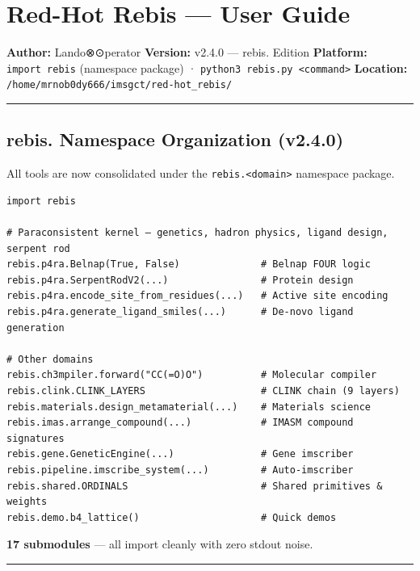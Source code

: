 \hypertarget{red-hot-rebis-user-guide}{%
\section{Red-Hot Rebis --- User Guide}\label{red-hot-rebis-user-guide}}

\textbf{Author:} Lando⊗⊙perator \textbf{Version:} v2.4.0 --- rebis.
Edition \textbf{Platform:} \texttt{import\ rebis} (namespace package) ·
\texttt{python3\ rebis.py\ \textless{}command\textgreater{}}
\textbf{Location:} \texttt{/home/mrnob0dy666/imsgct/red-hot\_rebis/}

\begin{center}\rule{0.5\linewidth}{0.5pt}\end{center}

\hypertarget{rebis.-namespace-organization-v2.4.0}{%
\subsection{rebis. Namespace Organization
(v2.4.0)}\label{rebis.-namespace-organization-v2.4.0}}

All tools are now consolidated under the
\texttt{rebis.\textless{}domain\textgreater{}} namespace package.

\begin{verbatim}
import rebis

# Paraconsistent kernel — genetics, hadron physics, ligand design, serpent rod
rebis.p4ra.Belnap(True, False)              # Belnap FOUR logic
rebis.p4ra.SerpentRodV2(...)                # Protein design
rebis.p4ra.encode_site_from_residues(...)   # Active site encoding
rebis.p4ra.generate_ligand_smiles(...)      # De-novo ligand generation

# Other domains
rebis.ch3mpiler.forward("CC(=O)O")          # Molecular compiler
rebis.clink.CLINK_LAYERS                    # CLINK chain (9 layers)
rebis.materials.design_metamaterial(...)    # Materials science
rebis.imas.arrange_compound(...)            # IMASM compound signatures
rebis.gene.GeneticEngine(...)               # Gene imscriber
rebis.pipeline.imscribe_system(...)         # Auto-imscriber
rebis.shared.ORDINALS                       # Shared primitives & weights
rebis.demo.b4_lattice()                     # Quick demos
\end{verbatim}

\textbf{17 submodules} --- all import cleanly with zero stdout noise.

\begin{center}\rule{0.5\linewidth}{0.5pt}\end{center}

